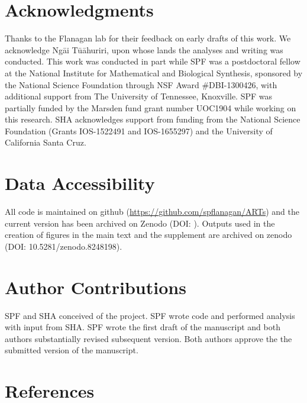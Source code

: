 \documentclass[
  11pt,
  a4paper,
]{article}
\begin{document}
\hypertarget{acknowledgments}{%
\section{Acknowledgments}\label{acknowledgments}}

Thanks to the Flanagan lab for their feedback on early drafts of this
work. We acknowledge Ngāi Tūāhuriri, upon whose lands the analyses and
writing was conducted. This work was conducted in part while SPF was a
postdoctoral fellow at the National Institute for Mathematical and
Biological Synthesis, sponsored by the National Science Foundation
through NSF Award \#DBI-1300426, with additional support from The
University of Tennessee, Knoxville. SPF was partially funded by the
Marsden fund grant number UOC1904 while working on this research. SHA
acknowledges support from funding from the National Science Foundation
(Grants IOS-1522491 and IOS-1655297) and the University of California
Santa Cruz.

\hypertarget{data-accessibility}{%
\section{Data Accessibility}\label{data-accessibility}}

All code is maintained on github (\url{https://github.com/spflanagan/ARTs})
and the current version has been archived on Zenodo (DOI: ). Outputs
used in the creation of figures in the main text and the supplement are
archived on zenodo (DOI: 10.5281/zenodo.8248198).

\hypertarget{author-contributions}{%
\section{Author Contributions}\label{author-contributions}}

SPF and SHA conceived of the project. SPF wrote code and performed
analysis with input from SHA. SPF wrote the first draft of the
manuscript and both authors substantially revised subsequent version.
Both authors approve the the submitted version of the manuscript.

\hypertarget{references}{%
\section*{References}\label{references}}
\end{document}
